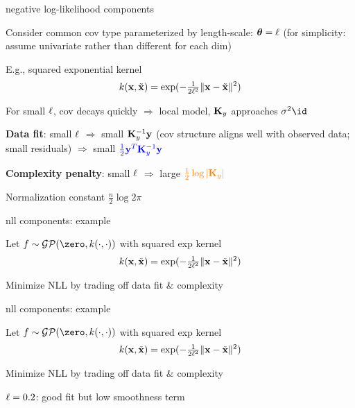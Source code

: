 \documentclass[11pt,compress,t,notes=noshow, xcolor=table]{beamer}
\begin{document}
\begin{framei}[sep=L]{negative log-likelihood components}
\item Consider common cov type parameterized by length-scale: $\bm{\theta} = \ell$ (for simplicity: assume univariate rather than different for each dim) 
\item E.g., squared exponential kernel $$k(\mathbf{x}, \tilde{\mathbf{x}}) = \exp(-\tfrac{1}{2 \ell^2} \| \mathbf{x} - \tilde{\mathbf{x}} \|^2)$$
\item For small $\ell$, cov decays quickly $\Rightarrow$ local model, $\mathbf{K}_y$ approaches $\sigma^2 \id$
\item \textbf{Data fit}: small $\ell$ $\Rightarrow$ small $\mathbf{K}_y^{-1} \mathbf{y}$ (cov structure aligns well with observed data; small residuals) $\Rightarrow$ small $\textcolor{blue}{\tfrac{1}{2} \mathbf{y}^T \mathbf{K}_y^{-1} \mathbf{y}}$
\item \textbf{Complexity penalty}: small  $\ell$ $\Rightarrow$ large $\textcolor{orange}{\tfrac{1}{2} \log | \mathbf{K}_y |}$
\item Normalization constant $\tfrac{n}{2} \log 2 \pi$
\end{framei}


\begin{framei}[sep=L]{nll components: example}
\item Let $f \sim \mathcal{GP}(\zero, k(\cdot, \cdot))$ with squared exp kernel $$k(\mathbf{x}, \tilde{\mathbf{x}}) = \exp(-\tfrac{1}{2 \ell^2} \| \mathbf{x} - \tilde{\mathbf{x}} \|^2)$$
\item Minimize NLL by trading off data fit \& complexity
\vfill
{}
\end{framei}

\begin{framei}[sep=L]{nll components: example}
\item Let $f \sim \mathcal{GP}(\zero, k(\cdot, \cdot))$ with squared exp kernel $$k(\mathbf{x}, \tilde{\mathbf{x}}) = \exp(-\tfrac{1}{2 \ell^2} \| \mathbf{x} - \tilde{\mathbf{x}} \|^2)$$\item Minimize NLL by trading off data fit \& complexity
\item $\ell = 0.2$: good fit but low smoothness term
\vfill
{}
\end{framei}
\end{document}
